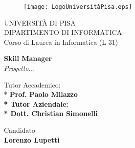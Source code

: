 \begin{titlepage}
\begin{figure}[!htb]
    \centering
    \texttt{[image: LogoUniversitàPisa.eps]}
\end{figure}

\begin{center}
    \LARGE{UNIVERSITÀ DI PISA}
    \vspace{5mm}
    \\ \large{DIPARTIMENTO DI INFORMATICA }
    \vspace{5mm}
    \\ \LARGE{Corso di Laurea in Informatica (L-31)}
\end{center}

\vspace{15mm}
\begin{center}
    {\LARGE{\bf Skill Manager}}\\ \bigskip
    {\large{\it Progetto... }}
\end{center}
\vspace{30mm}

\begin{minipage}[t]{0.47\textwidth}
    {\sc Tutor Accademico:}\vspace{3mm} \\*  %
    \bf\large{Prof. Paolo Milazzo} \\*
    {\sc Tutor Aziendale:}\vspace{3mm} \\*
    \bf\large{Dott. Christian Simonelli}
\end{minipage}
\hfill
\begin{minipage}[t]{0.47\textwidth}\raggedleft
	{{\sc Candidato}{\normalsize\vspace{3mm} \bf\\ \large{Lorenzo Lupetti\\ }}}
\end{minipage}

\vspace{50mm}
\hrulefill
\\

\end{titlepage}